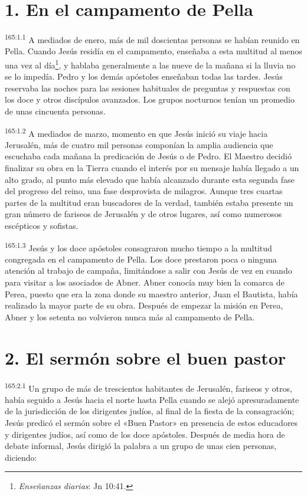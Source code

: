 \section*{1. En el campamento de Pella}
\par 
\textsuperscript{165:1.1} A mediados de enero, más de mil doscientas personas se habían reunido en Pella. Cuando Jesús residía en el campamento, enseñaba a esta multitud al menos una vez al día\footnote{\textit{Enseñanzas diarias}: Jn 10:41.}, y hablaba generalmente a las nueve de la mañana si la lluvia no se lo impedía. Pedro y los demás apóstoles enseñaban todas las tardes. Jesús reservaba las noches para las sesiones habituales de preguntas y respuestas con los doce y otros discípulos avanzados. Los grupos nocturnos tenían un promedio de unas cincuenta personas.

\par 
\textsuperscript{165:1.2} A mediados de marzo, momento en que Jesús inició su viaje hacia Jerusalén, más de cuatro mil personas componían la amplia audiencia que escuchaba cada mañana la predicación de Jesús o de Pedro. El Maestro decidió finalizar su obra en la Tierra cuando el interés por su mensaje había llegado a un alto grado, al punto más elevado que había alcanzado durante esta segunda fase del progreso del reino, una fase desprovista de milagros. Aunque tres cuartas partes de la multitud eran buscadores de la verdad, también estaba presente un gran número de fariseos de Jerusalén y de otros lugares, así como numerosos escépticos y sofistas.

\par 
\textsuperscript{165:1.3} Jesús y los doce apóstoles consagraron mucho tiempo a la multitud congregada en el campamento de Pella. Los doce prestaron poca o ninguna atención al trabajo de campaña, limitándose a salir con Jesús de vez en cuando para visitar a los asociados de Abner. Abner conocía muy bien la comarca de Perea, puesto que era la zona donde su maestro anterior, Juan el Bautista, había realizado la mayor parte de su obra. Después de empezar la misión en Perea, Abner y los setenta no volvieron nunca más al campamento de Pella.

\section*{2. El sermón sobre el buen pastor}
\par 
\textsuperscript{165:2.1} Un grupo de más de trescientos habitantes de Jerusalén, fariseos y otros, había seguido a Jesús hacia el norte hasta Pella cuando se alejó apresuradamente de la jurisdicción de los dirigentes judíos, al final de la fiesta de la consagración; Jesús predicó el sermón sobre el «Buen Pastor» en presencia de estos educadores y dirigentes judíos, así como de los doce apóstoles. Después de media hora de debate informal, Jesús dirigió la palabra a un grupo de unas cien personas, diciendo:

